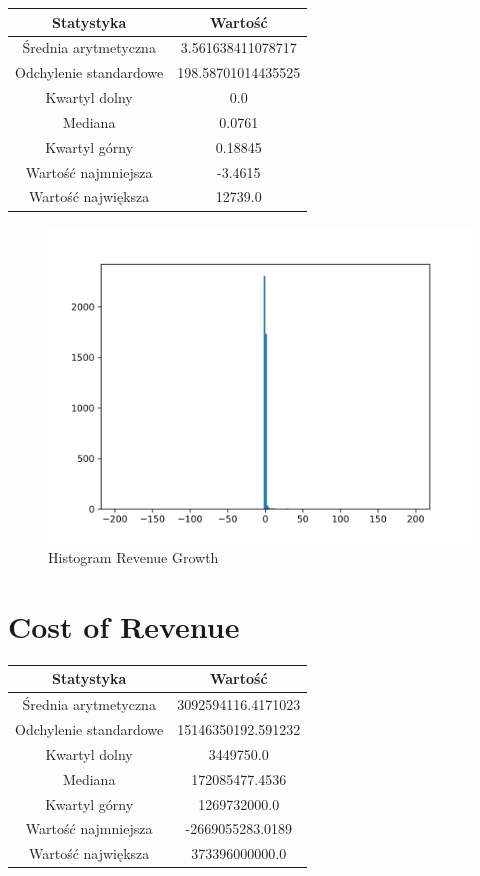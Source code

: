 \documentclass{article}
\begin{document}
\begin{center}
    \begin{tabular}{|c | c|} 
    \hline
    Statystyka & Wartość \\
    \hline\hline
    Średnia arytmetyczna & 3.561638411078717 \\ 
    \hline
    Odchylenie standardowe & 198.58701014435525 \\
    \hline
    Kwartyl dolny & 0.0 \\
    \hline
    Mediana & 0.0761 \\
    \hline
    Kwartyl górny & 0.18845 \\
    \hline
    Wartość najmniejsza & -3.4615 \\
    \hline
    Wartość największa & 12739.0 \\
    \hline
   \end{tabular}
\end{center}

\begin{figure}[h!]
    \includegraphics[width=\linewidth]{variables/Revenue Growth.png}
    \caption{Histogram Revenue Growth }
\end{figure}\section{ Cost of Revenue }

\begin{center}
    \begin{tabular}{|c | c|} 
    \hline
    Statystyka & Wartość \\
    \hline\hline
    Średnia arytmetyczna & 3092594116.4171023 \\ 
    \hline
    Odchylenie standardowe & 15146350192.591232 \\
    \hline
    Kwartyl dolny & 3449750.0 \\
    \hline
    Mediana & 172085477.4536 \\
    \hline
    Kwartyl górny & 1269732000.0 \\
    \hline
    Wartość najmniejsza & -2669055283.0189 \\
    \hline
    Wartość największa & 373396000000.0 \\
    \hline
   \end{tabular}
\end{center}
\end{document}
